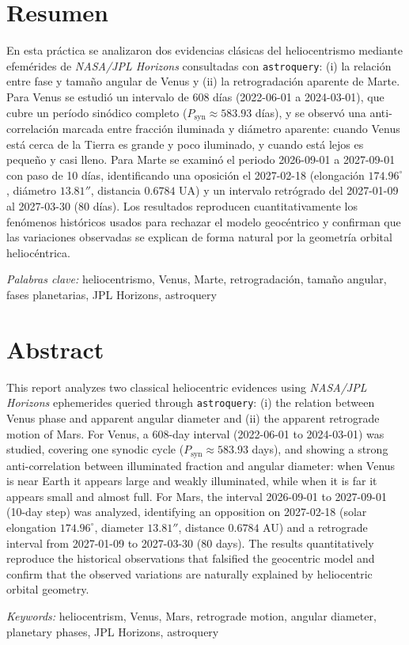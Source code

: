 \markright{\mititulo \hspace{5cm} \thepage}
\pagestyle{fancy}

\section*{Resumen}

\noindent En esta práctica se analizaron dos evidencias clásicas del heliocentrismo
mediante efemérides de \textit{NASA/JPL Horizons} consultadas con
\texttt{astroquery}: (i) la relación entre fase y tamaño angular de Venus y
(ii) la retrogradación aparente de Marte.
Para Venus se estudió un intervalo de 608 días (2022-06-01 a 2024-03-01), que
cubre un período sinódico completo ($P_{\text{syn}}\approx 583.93$ días), y se
observó una anti-correlación marcada entre fracción iluminada y diámetro
aparente: cuando Venus está cerca de la Tierra es grande y poco iluminado, y
cuando está lejos es pequeño y casi lleno.
Para Marte se examinó el periodo 2026-09-01 a 2027-09-01 con paso de 10 días,
identificando una oposición el 2027-02-18 (elongación
$174.96^\circ$, diámetro $13.81''$, distancia $0.6784$ UA) y un intervalo
retrógrado del 2027-01-09 al 2027-03-30 (80 días).
Los resultados reproducen cuantitativamente los fenómenos históricos usados para
rechazar el modelo geocéntrico y confirman que las variaciones observadas se
explican de forma natural por la geometría orbital heliocéntrica.

\vspace{1cm}\textit{Palabras clave:} heliocentrismo, Venus, Marte, retrogradación,
tamaño angular, fases planetarias, JPL Horizons, astroquery

\newpage

\section*{Abstract}

\noindent This report analyzes two classical heliocentric evidences using
\textit{NASA/JPL Horizons} ephemerides queried through \texttt{astroquery}:
(i) the relation between Venus phase and apparent angular diameter and
(ii) the apparent retrograde motion of Mars.
For Venus, a 608-day interval (2022-06-01 to 2024-03-01) was studied,
covering one synodic cycle ($P_{\text{syn}}\approx 583.93$ days), and showing
a strong anti-correlation between illuminated fraction and angular diameter:
when Venus is near Earth it appears large and weakly illuminated, while when
it is far it appears small and almost full.
For Mars, the interval 2026-09-01 to 2027-09-01 (10-day step) was analyzed,
identifying an opposition on 2027-02-18 (solar elongation
$174.96^\circ$, diameter $13.81''$, distance $0.6784$ AU) and a retrograde
interval from 2027-01-09 to 2027-03-30 (80 days).
The results quantitatively reproduce the historical observations that falsified
the geocentric model and confirm that the observed variations are naturally
explained by heliocentric orbital geometry.

\vspace{1cm}\textit{Keywords:} heliocentrism, Venus, Mars, retrograde motion,
angular diameter, planetary phases, JPL Horizons, astroquery

\newpage
